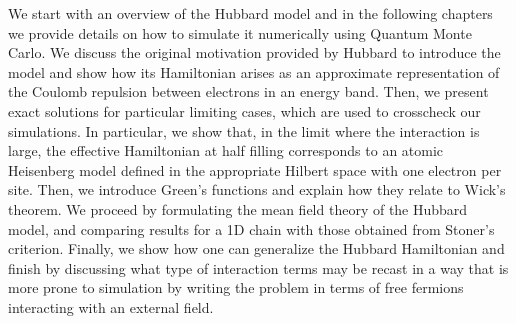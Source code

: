\label{cap:hubbard}

\slshape

We start with an overview of the Hubbard model and in the following chapters we provide details on how to simulate it numerically using Quantum Monte Carlo. We discuss the original motivation provided by Hubbard to introduce the model and show how its Hamiltonian arises as an approximate representation of the Coulomb repulsion between electrons in an energy band. Then, we present exact solutions for particular limiting cases, which are used to crosscheck our simulations. In particular, we show that, in the limit where the interaction is large, the effective Hamiltonian at half filling corresponds to an atomic Heisenberg model defined in the appropriate Hilbert space with one electron per site.
Then, we introduce Green's functions and explain how they relate to Wick's theorem. We proceed by formulating the mean field theory of the Hubbard model, and comparing results for a \acs{1D} chain with those obtained from Stoner's criterion.
Finally, we show how one can generalize the Hubbard Hamiltonian and finish by discussing what type of interaction terms may be recast in a way that is more prone to simulation by writing the problem in terms of free fermions interacting with an external field.

\normalfont









\cleardoublepage
